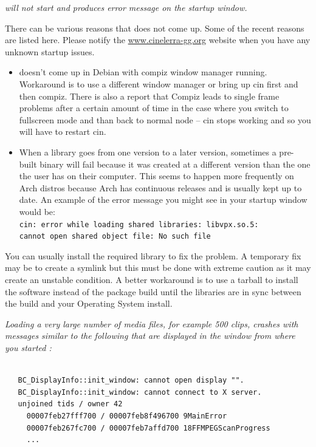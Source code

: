 \textit{\CGG{} will not start and produces error message on the startup window.}

There can be various reasons that \CGG{} does not come up. Some of the recent reasons are listed here. Please notify the {\small \href{http://www.cinelerra-gg.org/}{www.cinelerra-gg.org}} website when you have any unknown startup issues.
\medskip

\begin{itemize}[nosep]
	\item \CGG{} doesn't come up in Debian with compiz window manager running. Workaround is to use a different window manager or bring up cin first and then compiz. There is also a report that Compiz leads to single frame problems after a certain amount of time in the case where you switch to fullscreen mode and than back to normal node -- cin stops working and so you will have to restart cin.
	\item When a library goes from one version to a later version, sometimes a pre-built \CGG{} binary will fail because it was created at a different version than the one the user has on their computer. This seems to happen more frequently on Arch distros because Arch has continuous releases and is usually kept up to date. An example of the error message you might see in your startup window would be:\\
	\texttt{cin: error while loading shared libraries: libvpx.so.5: \\
	cannot open shared object file: No such file}
\end{itemize}
\medskip

You can usually install the required library to fix the problem. A temporary fix may be to create a symlink but this must be done with extreme caution as it may create an unstable condition. A better workaround is to use a tarball to install the software instead of the package build until the libraries are in sync between the build and your Operating System install.
\bigskip

\textit{Loading a very large number of media files, for example 500 clips, crashes \CGG{} with messages similar to the following that are displayed in the window from where you started \CGG{}:}

\begin{lstlisting}[numbers=none,xleftmargin=10mm]

   BC_DisplayInfo::init_window: cannot open display "".
   BC_DisplayInfo::init_window: cannot connect to X server.
   unjoined tids / owner 42
     00007feb27fff700 / 00007feb8f496700 9MainError
     00007feb267fc700 / 00007feb7affd700 18FFMPEGScanProgress
     ... 

\end{lstlisting}

